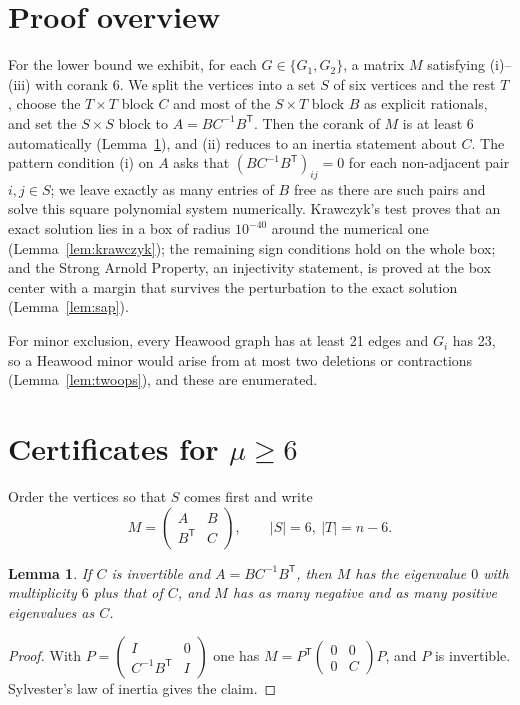 \documentclass[11pt]{article}
\newtheorem{lemma}[theorem]{Lemma}
\theoremstyle{remark}
\begin{document}
\section{Proof overview}
For the lower bound we exhibit, for each $G\in\{G_1,G_2\}$, a matrix $M$
satisfying (i)--(iii) with corank 6. We split the vertices into a set $S$
of six vertices and the rest $T$, choose the $T\times T$ block $C$ and most
of the $S\times T$ block $B$ as explicit rationals, and set the $S\times S$
block to $A=BC^{-1}B^{\mathsf T}$. Then the corank of $M$ is at least $6$
automatically (Lemma~\ref{lem:schur}), and (ii) reduces to an inertia
statement about $C$. The pattern condition (i) on $A$ asks that
$(BC^{-1}B^{\mathsf T})_{ij}=0$ for each non-adjacent pair $i,j\in S$; we
leave exactly as many entries of $B$ free as there are such pairs and
solve this square polynomial system numerically. Krawczyk's test proves
that an exact solution lies in a box of radius $10^{-40}$ around the
numerical one (Lemma~\ref{lem:krawczyk}); the remaining sign conditions
hold on the whole box; and the Strong Arnold Property, an injectivity
statement, is proved at the box center with a margin that survives the
perturbation to the exact solution (Lemma~\ref{lem:sap}).

For minor exclusion, every Heawood graph has at least 21 edges and $G_i$
has 23, so a Heawood minor would arise from at most two deletions or
contractions (Lemma~\ref{lem:twoops}), and these are enumerated.

\section{Certificates for \texorpdfstring{$\mu\ge6$}{mu >= 6}}\label{sec:lower}

Order the vertices so that $S$ comes first and write
\[
M=\begin{pmatrix}A&B\\ B^{\mathsf T}&C\end{pmatrix},\qquad |S|=6,\ |T|=n-6.
\]

\begin{lemma}\label{lem:schur}
If $C$ is invertible and $A=BC^{-1}B^{\mathsf T}$, then $M$ has the
eigenvalue $0$ with multiplicity $6$ plus that of $C$, and $M$ has as many
negative and as many positive eigenvalues as $C$.
\end{lemma}

\begin{proof}
With $P=\left(\begin{smallmatrix}I&0\\ C^{-1}B^{\mathsf T}&I\end{smallmatrix}\right)$
one has $M=P^{\mathsf T}\left(\begin{smallmatrix}0&0\\0&C\end{smallmatrix}\right)P$,
and $P$ is invertible. Sylvester's law of inertia gives the claim.
\end{proof}
\end{document}
